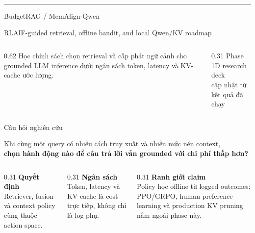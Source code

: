 \documentclass[aspectratio=169,10pt]{beamer}
\newcommand{\minihead}[1]{{\bfseries\color{AccentDark}#1}}
\begin{document}
\begin{frame}[plain]
  \vspace{0.40cm}
  {\color{Accent}\rule{0.30\paperwidth}{1.1pt}}\par
  \vspace{0.74cm}
  { BudgetRAG / MemAlign-Qwen\par}
  \vspace{0.24cm}
  {\color{Muted}
    RLAIF-guided retrieval, offline bandit, and local Qwen/KV roadmap\par}

  \vfill
  \begin{columns}[T,onlytextwidth]
    \begin{column}{0.62\textwidth}
      \large
      Học chính sách chọn retrieval và cấp phát ngữ cảnh cho grounded LLM inference dưới ngân sách token, latency và KV-cache ước lượng.
    \end{column}
    \begin{column}{0.31\textwidth}
      \raggedleft
      \footnotesize\color{Muted}
      Phase 1D research deck\\
      cập nhật từ kết quả đã chạy
    \end{column}
  \end{columns}
\end{frame}

\begin{frame}{Câu hỏi nghiên cứu}
  \small
  \begin{center}
    \normalsize
    Khi cùng một query có nhiều cách truy xuất và nhiều mức nén context,\\[0.45em]
    \textbf{chọn hành động nào để câu trả lời vẫn grounded với chi phí thấp hơn?}
  \end{center}

  \vfill
  \begin{columns}[T,onlytextwidth]
    \begin{column}{0.31\textwidth}
      \minihead{Quyết định}\\
      \color{Muted}Retriever, fusion và context policy cùng thuộc action space.
    \end{column}
    \begin{column}{0.31\textwidth}
      \minihead{Ngân sách}\\
      \color{Muted}Token, latency và KV-cache là cost trực tiếp, không chỉ là log phụ.
    \end{column}
    \begin{column}{0.31\textwidth}
      \minihead{Ranh giới claim}\\
      \color{Muted}Policy học offline từ logged outcomes; PPO/GRPO, human preference learning và production KV pruning nằm ngoài phase này.
    \end{column}
  \end{columns}
\end{frame}
\end{document}

